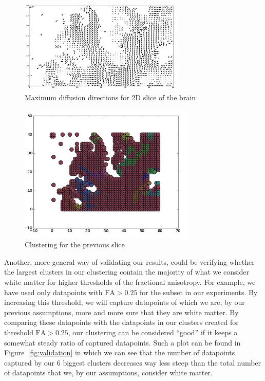 \documentclass{article} %
\begin{document}
\begin{figure}[H]
  \begin{center}
    \includegraphics[width=0.7\textwidth]{img/2.png}
  \end{center}
  \caption{Maximum diffusion directions for 2D slice of the brain}
  \label{fig:arrows}
\end{figure}

\begin{figure}[H]
  \begin{center}
    \includegraphics[width=0.75\textwidth,height=0.25\textheight]{img/1.png}
  \end{center}
  \caption{Clustering for the previous slice}
  \label{fig:arrows_clustered}
\end{figure}

Another, more general way of validating our results, could be verifying whether the largest clusters in our clustering contain the majority of what we consider white matter for higher thresholds of the fractional anisotropy. For example, we have used only datapoints with $\text{FA} > 0.25$ for the subset in our experiments. By increasing this threshold, we will capture datapoints of which we are, by our previous assumptions, more and more sure that they are white matter. By comparing these datapoints with the datapoints in our clusters created for threshold $\text{FA} > 0.25$, our clustering can be considered ``good'' if it keeps a somewhat steady ratio of captured datapoints. Such a plot can be found in Figure~\ref{fig:validation} in which we can see that the number of datapoints captured by our 6 biggest clusters decreases way less steep than the total number of datapoints that we, by our assumptions, consider white matter.
\end{document}
